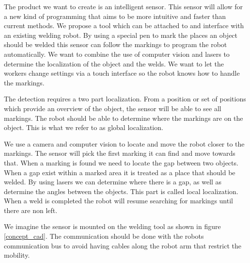 The product we want to create is an intelligent sensor.
This sensor will allow for a new kind of programming that aims to be more intuitive and faster than current methods.
We propose a tool which can be attached to and interface with an existing welding robot. 
By using a special pen to mark the places an object should be welded this sensor can follow the markings to program the robot automatically.
We want to combine the use of computer vision and lasers to determine the localization of the object and the welds.
We want to let the workers change settings via a touch interface so the robot knows how to handle the markings. 

The detection requires a two part localization. 
From a position or set of positions which provide an overview of the object, the sensor will be able to see all markings.
The robot should be able to determine where the markings are on the object. 
This is what we refer to as global localization.

We use a camera and computer vision to locate and move the robot closer to the markings.
The sensor will pick the first marking it can find and move towards that. 
When a marking is found we need to locate the gap between two objects. 
When a gap exist within a marked area it is treated as a place that should be welded.
By using lasers we can determine where there is a gap, as well as determine the angles between the objects.
This part is called local localization.
When a weld is completed the robot will resume searching for markings until there are non left.

We imagine the sensor is mounted on the welding tool as shown in figure \ref{concept_cad}. 
The communication should be done with the robots communication bus to avoid having cables along the robot arm that restrict the mobility.

